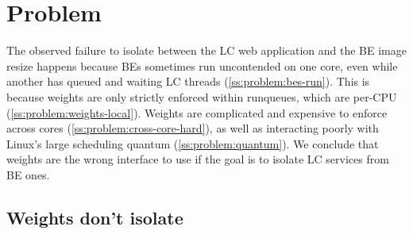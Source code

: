 \section{Problem}\label{s:problem}

The observed failure to isolate between the LC web application and the BE image
resize happens because BEs sometimes run uncontended on one core, even while
another has queued and waiting LC threads (\autoref{ss:problem:bes-run}). This
is because weights are only strictly enforced within runqueues, which are
per-CPU (\autoref{ss:problem:weights-local}). Weights are complicated and
expensive to enforce across cores (\autoref{ss:problem:cross-core-hard}), as
well as interacting poorly with Linux's large scheduling quantum
(\autoref{ss:problem:quantum}). We conclude that weights are the wrong interface
to use if the goal is to isolate LC services from BE ones.


\subsection{Weights don't isolate}\label{ss:problem:bes-run}

